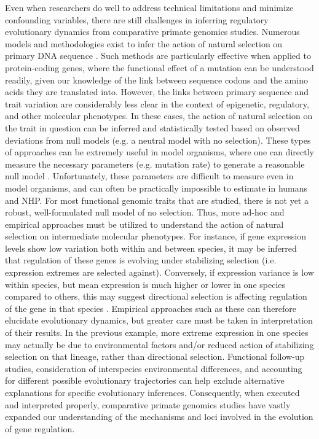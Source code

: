 Even when researchers do well to address technical limitations and minimize confounding variables, there are still challenges in inferring regulatory evolutionary dynamics from comparative primate genomics studies. Numerous models and methodologies exist to infer the action of natural selection on primary DNA sequence \cite{Vitti.2013}. Such methods are particularly effective when applied to protein-coding genes, where the functional effect of a mutation can be understood readily, given our knowledge of the link between sequence codons and the amino acids they are translated into. However, the links between primary sequence and trait variation are considerably less clear in the context of epigenetic, regulatory, and other molecular phenotypes. In these cases, the action of natural selection on the trait in question can be inferred and statistically tested based on observed deviations from null models (e.g. a neutral model with no selection). These types of approaches can be extremely useful in model organisms, where one can directly measure the necessary parameters (e.g. mutation rate) to generate a reasonable null model \cite{Gilad.2006a}. Unfortunately, these parameters are difficult to measure even in model organisms, and can often be practically impossible to estimate in humans and NHP. For most functional genomic traits that are studied, there is not yet a robust, well-formulated null model of no selection. Thus, more ad-hoc and empirical approaches must be utilized to understand the action of natural selection on intermediate molecular phenotypes. For instance, if gene expression levels show low variation both within and between species, it may be inferred that regulation of these genes is evolving under stabilizing selection (i.e. expression extremes are selected against). Conversely, if expression variance is low within species, but mean expression is much higher or lower in one species compared to others, this may suggest directional selection is affecting regulation of the gene in that species \cite{Romero.2012}. Empirical approaches such as these can therefore elucidate evolutionary dynamics, but greater care must be taken in interpretation of their results. In the previous example, more extreme expression in one species may actually be due to environmental factors and/or reduced action of stabilizing selection on that lineage, rather than directional selection. Functional follow-up studies, consideration of interspecies environmental differences, and accounting for different possible evolutionary trajectories can help exclude alternative explanations for specific evolutionary inferences. Consequently, when executed and interpreted properly, comparative primate genomics studies have vastly expanded our understanding of the mechanisms and loci involved in the evolution of gene regulation.

